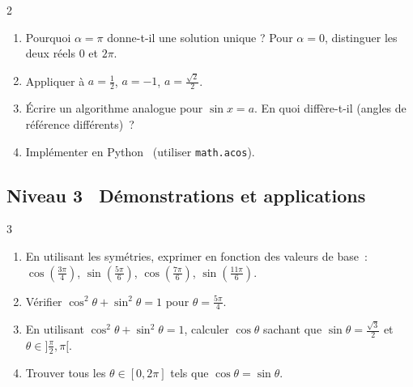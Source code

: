 \begin{exo}[\logicoalgo\ Algorithme~: r\'esoudre $\cos x = a$ sur {$[0,2\pi]$} \corrige]{2}

\begin{algorithm}[H]
\caption{R\'esolution de $\cos x = a$ sur $[0,2\pi]$}
\end{algorithm}

\begin{enumerate}
  \item Pourquoi $\alpha=\pi$ donne-t-il une solution unique ?
        Pour $\alpha=0$, distinguer les deux r\'eels $0$ et $2\pi$.
  \item Appliquer \`a $a=\frac{1}{2}$, $a=-1$, $a=\frac{\sqrt{2}}{2}$.
  \item \'Ecrire un algorithme analogue pour $\sin x = a$.
        En quoi diff\`ere-t-il (angles de r\'ef\'erence diff\'erents)~?
  \item Impl\'ementer en Python \computer\ (utiliser \texttt{math.acos}).
\end{enumerate}
\end{exo}

\subsection*{\quad Niveau 3 \textemdash\ D\'emonstrations et applications}

\begin{exo}{3}
\begin{enumerate}
  \item En utilisant les sym\'etries, exprimer en fonction des valeurs de base~:
        $\cos(\frac{3\pi}{4})$, $\sin(\frac{5\pi}{6})$, $\cos(\frac{7\pi}{6})$, $\sin(\frac{11\pi}{6})$.
  \item V\'erifier $\cos^2\theta+\sin^2\theta=1$ pour $\theta=\frac{5\pi}{4}$.
  \item En utilisant $\cos^2\theta+\sin^2\theta=1$, calculer $\cos\theta$
        sachant que $\sin\theta=\frac{\sqrt{3}}{2}$ et $\theta\in]\frac{\pi}{2},\pi[$.
  \item Trouver tous les $\theta\in[0,2\pi]$ tels que $\cos\theta=\sin\theta$.
\end{enumerate}
\end{exo}

